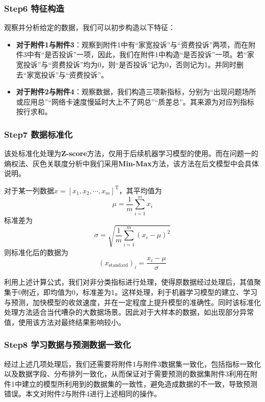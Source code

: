 \documentclass{MathorCupmodeling}
\begin{document}
	\subsubsection*{Step6 特征构造}
	观察并分析给定的数据，我们可以初步构造以下特征：
	\begin{itemize}
		\item \textbf{对于附件1与附件3}：观察到附件1中有“家宽投诉”与“资费投诉”两项，而在附件3中有“是否投诉”一项，因此，我们在附件1中构造“是否投诉”一项。若“家宽投诉”与“资费投诉”均为0，则“是否投诉”记为0，否则记为1。并同时删去“家宽投诉”与“资费投诉”。
		\item \textbf{对于附件2与附件4}：观察数据，我们构造三项新指标，分别为“出现问题场所或应用总”“网络卡速度慢延时大上不了网总”“质差总”。其来源为对应列指标按行求和。
	\end{itemize}
	\subsubsection*{Step7 数据标准化}
	该处标准化处理为\textbf{Z-score}方法，仅用于后续机器学习模型的使用。而在问题一的熵权法、灰色关联度分析中我们采用\textbf{Min-Max}方法，该方法在后文模型中会具体说明。

	对于某一列数据$x=\left[x_1,x_2,\cdots,x_m\right]^{\mathrm{T}}$，其平均值为
	\begin{equation}
		\mu=\frac{1}{m}\sum_{i=1}^{m}x_i \label{fmean}
	\end{equation}
	标准差为
	\begin{equation}
		\sigma=\sqrt{\frac{1}{m}\sum_{i=1}^{m}\left(x_i-\mu\right)^2} \label{fstd}
	\end{equation}
	则标准化后的数据为
	\begin{equation}
		\left(x_{\mathrm{standard}}\right)_i=\frac{x_i-\mu}{\sigma} \label{fstandardprocess}
	\end{equation}

	利用上述计算公式，我们对非分类指标进行处理，使得原数据经过处理后，其值聚集于0附近，即均值为0，标准差为1。这样处理，利于机器学习模型的建立、学习与预测，加快模型的收敛速度，并在一定程度上提升模型的准确性。同时该标准化处理方法适合当代嘈杂的大数据场景\textcolor{blue}{\cite{pstandard}}。因此对于大样本的数据，如出现部分异常值，使用该方法对最终结果影响较小。
	\subsubsection*{Step8 学习数据与预测数据一致化}
	经过上述几项处理后，我们还需要将附件1与附件3数据集一致化，包括指标一致化以及数据字段、分布排列一致化，从而保证对于需要预测的数据集附件3利用在附件1中建立的模型所利用到的数据集的一致性，避免造成数据的不一致，导致预测错误。本文对附件2与附件4进行上述相同的操作。
\end{document}
